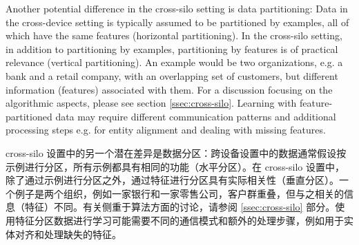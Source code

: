 Another potential difference in the cross-silo setting is data partitioning: Data in the cross-device setting is typically assumed to be partitioned by examples, all of which have the same features (horizontal partitioning). In the cross-silo setting, in addition to partitioning by examples, partitioning by features is of practical relevance (vertical partitioning). An example would be two organizations, e.g. a bank and a retail company,  with an overlapping set of customers, but different information (features) associated with them. For a discussion focusing on the algorithmic aspects, please see section \ref{ssec:cross-silo}. Learning with feature-partitioned data may require different communication patterns and additional processing steps e.g. for entity alignment and dealing with missing features.


cross-silo 设置中的另一个潜在差异是数据分区：跨设备设置中的数据通常假设按示例进行分区，所有示例都具有相同的功能（水平分区）。在 cross-silo 设置中，除了通过示例进行分区之外，通过特征进行分区具有实际相关性（垂直分区）。一个例子是两个组织，例如一家银行和一家零售公司，客户群重叠，但与之相关的信息（特征）不同。有关侧重于算法方面的讨论，请参阅 \ref{ssec:cross-silo} 部分。使用特征分区数据进行学习可能需要不同的通信模式和额外的处理步骤，例如用于实体对齐和处理缺失的特征。


